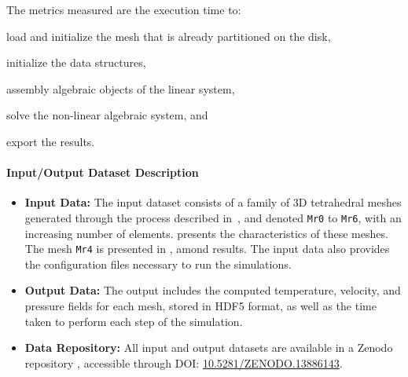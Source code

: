 The metrics measured are the execution time to:
\begin{inparaenum}[\it (i)]
    \item load and initialize the mesh that is already partitioned on the disk,
    \item initialize the data structures,
    \item assembly algebraic objects of the linear system,
    \item solve the non-linear algebraic system, and
    \item export the results.
\end{inparaenum}


\paragraph{Input/Output Dataset Description}

\begin{itemize}
    \item \textbf{Input Data:} The input dataset consists of a family of 3D tetrahedral meshes generated through the process described in~\cite{chabannes_3d_2024}, and denoted \texttt{Mr0} to \texttt{Mr6}, with an increasing number of elements.
     presents the characteristics of these meshes.
    The mesh \texttt{Mr4} is presented in , amond results.
    The input data also provides the configuration files necessary to run the simulations.
    \item \textbf{Output Data:} The output includes the computed temperature, velocity, and pressure fields for each mesh, stored in HDF5 format, as well as the time taken to perform each step of the simulation.
    \item \textbf{Data Repository:} All input and output datasets are available in a Zenodo repository \cite{saigre_mesh_2024}, accessible through DOI: \href{https://doi.org/10.5281/ZENODO.13886143}{10.5281/ZENODO.13886143}.
\end{itemize}


